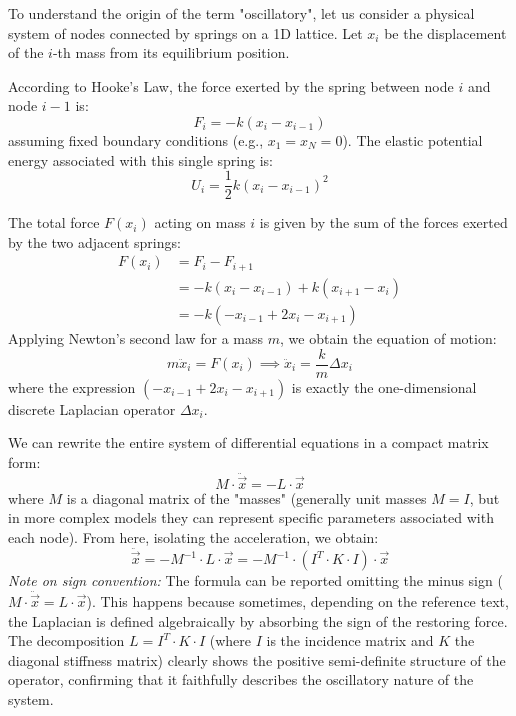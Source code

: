 \begin{example}
    To understand the origin of the term "oscillatory", let us consider a physical system of nodes connected by springs on a 1D lattice. Let \( x_i \) be the displacement of the \( i \)-th mass from its equilibrium position.

    According to Hooke's Law, the force exerted by the spring between node \( i \) and node \( i-1 \) is:
    \[
        F_{i} = -k(x_i - x_{i-1})
    \]
    assuming fixed boundary conditions (e.g., \( x_1 = x_N = 0 \)). The elastic potential energy associated with this single spring is:
    \[
        U_i = \frac{1}{2}k(x_i - x_{i-1})^2
    \]

    The total force \( F(x_i) \) acting on mass \( i \) is given by the sum of the forces exerted by the two adjacent springs:
    \[
        \begin{aligned}
            F(x_i) & = F_i - F_{i+1}                        \\
                   & = -k(x_i - x_{i-1}) + k(x_{i+1} - x_i) \\
                   & = -k(-x_{i-1} + 2x_i - x_{i+1})
        \end{aligned}
    \]
    Applying Newton's second law for a mass \( m \), we obtain the equation of motion:
    \[
        m\ddot{x}_i = F(x_i) \implies \ddot{x}_i = \frac{k}{m} \Delta x_i
    \]
    where the expression \( (-x_{i-1} + 2x_i - x_{i+1}) \) is exactly the one-dimensional discrete Laplacian operator \( \Delta x_i \).

    We can rewrite the entire system of differential equations in a compact matrix form:
    \[
        M \cdot \ddot{\vec{x}} = - L \cdot \vec{x}
    \]
    where \( M \) is a diagonal matrix of the "masses" (generally unit masses \( M = I \), but in more complex models they can represent specific parameters associated with each node). From here, isolating the acceleration, we obtain:
    \[
        \ddot{\vec{x}} = - M^{-1} \cdot L \cdot \vec{x} = - M^{-1} \cdot (I^T \cdot K \cdot I) \cdot \vec{x}
    \]
    \textit{Note on sign convention:} The formula can be reported omitting the minus sign (\( M \cdot \ddot{\vec{x}} = L \cdot \vec{x} \)). This happens because sometimes, depending on the reference text, the Laplacian is defined algebraically by absorbing the sign of the restoring force. The decomposition \( L = I^T \cdot K \cdot I \) (where \( I \) is the incidence matrix and \( K \) the diagonal stiffness matrix) clearly shows the positive semi-definite structure of the operator, confirming that it faithfully describes the oscillatory nature of the system.
\end{example}

